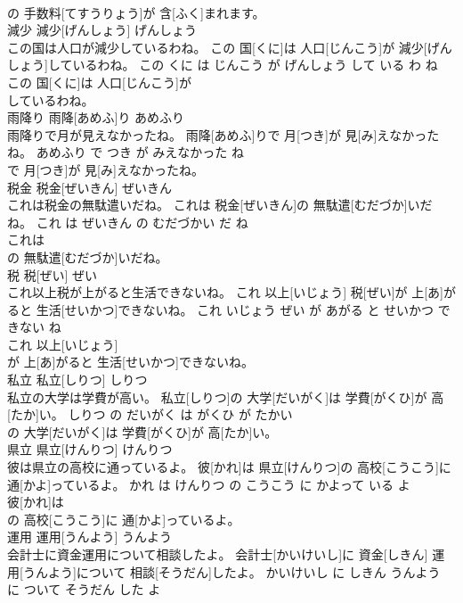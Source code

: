 \documentclass[8pt]{extreport}
\begin{document}
\begin{CJK}{UTF8}{min}
\\	の 手数料[てすうりょう]が 含[ふく]まれます。			
\\	減少	減少[げんしょう]	げんしょう	
\\	この国は人口が減少しているわね。	この 国[くに]は 人口[じんこう]が 減少[げんしょう]しているわね。	この くに は じんこう が げんしょう して いる わ ね	
\\	この 国[くに]は 人口[じんこう]が
\\	しているわね。			
\\	雨降り	雨降[あめふ]り	あめふり	
\\	雨降りで月が見えなかったね。	雨降[あめふ]りで 月[つき]が 見[み]えなかったね。	あめふり で つき が みえなかった ね	
\\	で 月[つき]が 見[み]えなかったね。			
\\	税金	税金[ぜいきん]	ぜいきん	
\\	これは税金の無駄遣いだね。	これは 税金[ぜいきん]の 無駄遣[むだづか]いだね。	これ は ぜいきん の むだづかい だ ね	
\\	これは
\\	の 無駄遣[むだづか]いだね。			
\\	税	税[ぜい]	ぜい	
\\	これ以上税が上がると生活できないね。	これ 以上[いじょう] 税[ぜい]が 上[あ]がると 生活[せいかつ]できないね。	これ いじょう ぜい が あがる と せいかつ できない ね	
\\	これ 以上[いじょう]
\\	が 上[あ]がると 生活[せいかつ]できないね。			
\\	私立	私立[しりつ]	しりつ	
\\	私立の大学は学費が高い。	私立[しりつ]の 大学[だいがく]は 学費[がくひ]が 高[たか]い。	しりつ の だいがく は がくひ が たかい	
\\	の 大学[だいがく]は 学費[がくひ]が 高[たか]い。			
\\	県立	県立[けんりつ]	けんりつ	
\\	彼は県立の高校に通っているよ。	彼[かれ]は 県立[けんりつ]の 高校[こうこう]に 通[かよ]っているよ。	かれ は けんりつ の こうこう に かよって いる よ	
\\	彼[かれ]は
\\	の 高校[こうこう]に 通[かよ]っているよ。			
\\	運用	運用[うんよう]	うんよう	
\\	会計士に資金運用について相談したよ。	会計士[かいけいし]に 資金[しきん] 運用[うんよう]について 相談[そうだん]したよ。	かいけいし に しきん うんよう に ついて そうだん した よ	

\end{CJK}
\end{document}
